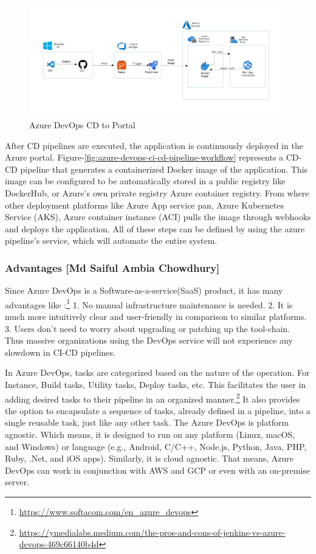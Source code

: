 \begin{figure}[h]
    \centering
    \includegraphics[width=14cm]{images/saiful/Azure_pipeline_diagram_CD.png}
    \caption{Azure DevOps CD to Portal}
    \label{fig:azure-devops-ci-cd-portal}
\end{figure}

After CD pipelines are executed, the application is continuously deployed in the Azure portal. Figure-\ref{fig:azure-devops-ci-cd-pipeline-workflow} represents a CD-CD pipeline that generates a containerized Docker image of the application. This image can be configured to be automatically stored in a public registry like DockerHub, or Azure's own private registry Azure container registry. From where other deployment platforms like Azure App service pan, Azure Kubernetes Service (AKS), Azure container instance (ACI) pulls the image through webhooks and deploys the application. All of these steps can be defined by using the azure pipeline's service, which will automate the entire system.

%

\subsubsection{Advantages [Md Saiful Ambia Chowdhury]}
%
Since Azure DevOps is a Software-as-a-service(SaaS) product, it has many advantages like :\footnote{\url{https://www.softacom.com/en_azure_devops}}
1. No manual infrastructure maintenance is needed. 2. It is much more intuitively clear and user-friendly in comparison to similar platforms. 3. Users don’t need to worry about upgrading or patching up the tool-chain. Thus massive organizations using the DevOps service will not experience any slowdown in CI-CD pipelines.
  
 In Azure DevOps, tasks are categorized based on the nature of the operation. For Instance, Build tasks, Utility tasks, Deploy tasks, etc. This facilitates the user in adding desired tasks to their pipeline in an organized manner.\footnote{\url{https://ymedialabs.medium.com/the-pros-and-cons-of-jenkins-vs-azure-devops-469c66140b4d}}
 It also provides the option to encapsulate a sequence of tasks, already defined in a pipeline, into a single reusable task, just like any other task.
   The Azure DevOps is platform agnostic. Which means, it is designed to run on any platform (Linux, macOS, and Windows) or language (e.g., Android, C/C++, Node.js, Python, Java, PHP, Ruby, .Net, and iOS apps).
Similarly, it is cloud agnostic. That means, Azure DevOps can work in conjunction with AWS and GCP or even with an on-premise server. 
%


